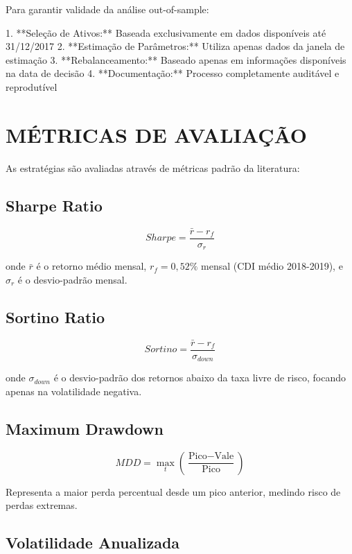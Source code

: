 Para garantir validade da análise out-of-sample:

1. **Seleção de Ativos:** Baseada exclusivamente em dados disponíveis até 31/12/2017
2. **Estimação de Parâmetros:** Utiliza apenas dados da janela de estimação
3. **Rebalanceamento:** Baseado apenas em informações disponíveis na data de decisão
4. **Documentação:** Processo completamente auditável e reprodutível

\section{MÉTRICAS DE AVALIAÇÃO}

As estratégias são avaliadas através de métricas padrão da literatura:

\subsection{Sharpe Ratio}

\begin{equation}
Sharpe = \frac{\bar{r} - r_f}{\sigma_r}
\end{equation}

onde $\bar{r}$ é o retorno médio mensal, $r_f = 0,52\%$ mensal (CDI médio 2018-2019), e $\sigma_r$ é o desvio-padrão mensal.

\subsection{Sortino Ratio}

\begin{equation}
Sortino = \frac{\bar{r} - r_f}{\sigma_{down}}
\end{equation}

onde $\sigma_{down}$ é o desvio-padrão dos retornos abaixo da taxa livre de risco, focando apenas na volatilidade negativa.

\subsection{Maximum Drawdown}

\begin{equation}
MDD = \max_{t} \left( \frac{\text{Pico} - \text{Vale}}{\text{Pico}} \right)
\end{equation}

Representa a maior perda percentual desde um pico anterior, medindo risco de perdas extremas.

\subsection{Volatilidade Anualizada}

